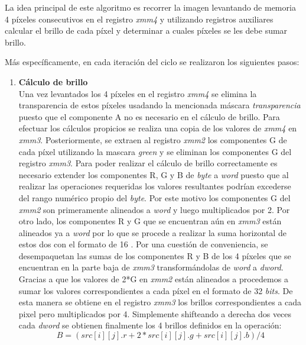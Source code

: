 \documentclass[a4paper]{article}
\begin{document}
La idea principal de este algoritmo es recorrer la imagen levantando de memoria 4 píxeles consecutivos en el registro \textit{xmm4} y utilizando registros auxiliares calcular el brillo de cada píxel y determinar a cuales píxeles se les debe sumar brillo.
 
 
 Más específicamente, en cada iteración del ciclo se realizaron los siguientes pasos:
 
 \begin{enumerate}
 	\item \textbf{Cálculo de brillo}\\
 	Una vez levantados los 4 píxeles en el registro \textit{xmm4} se elimina la transparencia de estos píxeles usadando la mencionada máscara \textit{transparencia} puesto que el componente A no es necesario en el cálculo de brillo. Para efectuar los cálculos propicios se realiza una copia de los valores de \textit{xmm4} en \textit{xmm3}. Posteriormente, se extraen al registro \textit{xmm2} los componentes G de cada píxel utilizando la mascara \textit{green} y se eliminan los componentes G del registro \textit{xmm3}.
 	Para poder realizar el cálculo de brillo correctamente es necesario extender los componentes R, G y B de \textit{byte} a \textit{word} puesto que al realizar las operaciones requeridas los valores resultantes podrían excederse del rango numérico propio del \textit{byte}. Por este motivo los componentes G del \textit{xmm2} son primeramente alineados a \textit{word} y luego multiplicados por 2. Por otro lado, los componentes R y G que se encuentran aún en \textit{xmm3} están alineados ya a \textit{word} por lo que se procede a realizar la suma horizontal de estos dos con el formato de 16 .
 	Por una cuestión de conveniencia, se desempaquetan las sumas de los componentes R y B de los 4 píxeles que se encuentran en la parte baja de \textit{xmm3} transformándolas de \textit{word} a \textit{dword}.  Gracias a que los valores de 2*G  en \textit{xmm2} están alineados a  procedemos a sumar los valores correspondientes a cada píxel en el formato de 32 \textit{bits}. De esta manera se obtiene en el registro \textit{xmm3} los brillos correspondientes a cada pixel pero multiplicados por 4. Simplemente shifteando a derecha dos veces cada \textit{dword} se obtienen finalmente los 4 brillos definidos en la operación: 
 	 \begin{equation}
 	B = (src[i][j].r + 2 * src[i][j].g + src[i][j].b)/4 
 	\end{equation}
 	 

\end{enumerate}
\end{document}
